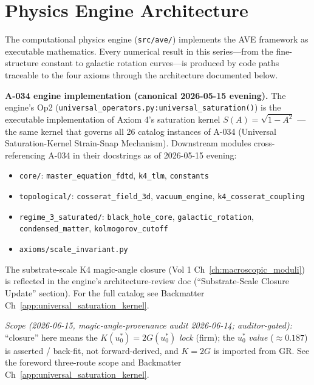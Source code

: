 %

\chapter{Physics Engine Architecture}
\label{ch:engine_architecture}

The computational physics engine (\texttt{src/ave/}) implements
the AVE framework as executable mathematics.  Every numerical
result in this series---from the fine-structure constant to galactic
rotation curves---is produced by code paths traceable to the four
axioms through the architecture documented below.

\textbf{A-034 engine implementation (canonical 2026-05-15 evening).} The
engine's Op2 (\texttt{universal\_operators.py:universal\_saturation()})
is the executable implementation of Axiom 4's saturation kernel
$S(A) = \sqrt{1 - A^2}$ --- the same kernel that governs all 26 catalog
instances of A-034 (Universal Saturation-Kernel Strain-Snap Mechanism).
Downstream modules cross-referencing A-034 in their docstrings as of
2026-05-15 evening:

\begin{itemize}
    \item \texttt{core/}: \texttt{master\_equation\_fdtd}, \texttt{k4\_tlm},
    \texttt{constants}
    \item \texttt{topological/}: \texttt{cosserat\_field\_3d},
    \texttt{vacuum\_engine}, \texttt{k4\_cosserat\_coupling}
    \item \texttt{regime\_3\_saturated/}: \texttt{black\_hole\_core},
    \texttt{galactic\_rotation}, \texttt{condensed\_matter},
    \texttt{kolmogorov\_cutoff}
    \item \texttt{axioms/scale\_invariant.py}
\end{itemize}

The substrate-scale K4 magic-angle closure (Vol 1
Ch~\ref{ch:macroscopic_moduli}) is reflected in the engine's
architecture-review doc (``Substrate-Scale Closure Update''
section). For the full catalog see Backmatter
Ch~\ref{app:universal_saturation_kernel}.

\emph{Scope (2026-06-15, magic-angle-provenance audit 2026-06-14; auditor-gated):} ``closure'' here means the $K(u_0^*) = 2G(u_0^*)$ \emph{lock} (firm); the $u_0^*$ \emph{value} ($\approx 0.187$) is asserted / back-fit, not forward-derived, and $K = 2G$ is imported from GR. See the foreword three-route scope and Backmatter Ch~\ref{app:universal_saturation_kernel}.

